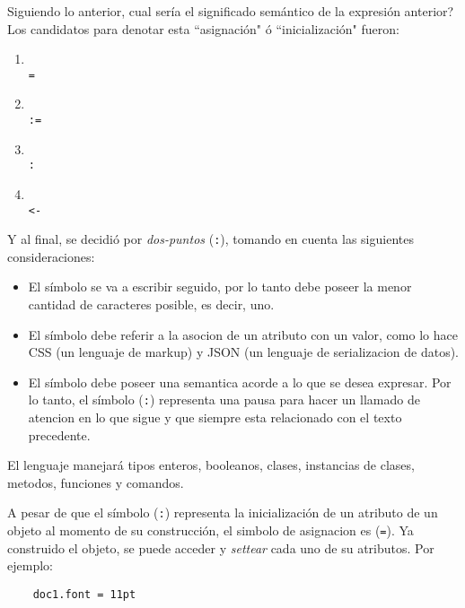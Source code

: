 \documentclass[12pt,letterpaper,titlepage,oneside,openright]{book}
\begin{document}
Siguiendo lo anterior, cual sería el significado semántico de la expresión
anterior? Los candidatos para denotar esta ``asignación" ó ``inicialización"
fueron:

\newpage

\begin{center}
\begin{enumerate}[label=Opción \alph*:, leftmargin=7em]
    \item \hfill \\
          \texttt{=}
    \item \hfill \\
          \texttt{:=}
    \item \hfill \\
          \texttt{:}
    \item \hfill \\
          \texttt{<-}
\end{enumerate}
\end{center}

Y al final, se decidió por \textit{dos-puntos} (\texttt{:}), tomando en cuenta
las siguientes consideraciones:

\begin{itemize}
\item El símbolo se va a escribir seguido, por lo tanto debe poseer la menor cantidad de caracteres posible, es decir, uno.
\item El símbolo debe referir a la asocion de un atributo con un valor, como lo hace CSS (un lenguaje de markup) y JSON (un lenguaje de serializacion de datos).
\item El símbolo debe poseer una semantica acorde a lo que se desea expresar. Por lo tanto, el símbolo (\texttt{:}) representa una pausa para hacer un llamado de atencion en lo que sigue y que siempre esta relacionado con el texto precedente. 
\end{itemize}

El lenguaje manejará tipos enteros, booleanos, clases, instancias de clases,
metodos, funciones y comandos.

A pesar de que el símbolo (\texttt{:}) representa la inicialización de un
atributo de un objeto al momento de su construcción, el simbolo de asignacion es
(\texttt{=}). Ya construido el objeto, se puede acceder y \textit{settear} cada
uno de su atributos. Por ejemplo:

\begin{center}
\begin{lstlisting}
    doc1.font = 11pt
\end{lstlisting}
\end{center}
\end{document}
